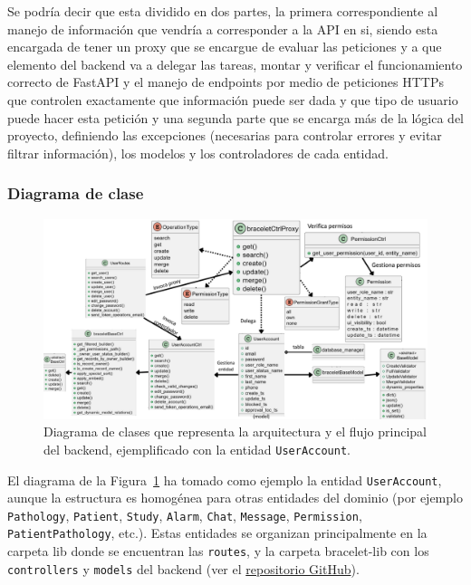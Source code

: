\documentclass[12pt, a4paper]{article}
\begin{document}
Se podría decir que esta dividido en dos partes, la primera correspondiente al manejo de información que vendría a corresponder a la API en si, siendo esta encargada de tener un proxy que se encargue de evaluar las peticiones y a que elemento del backend va a delegar las tareas, montar y verificar el funcionamiento correcto de FastAPI y el manejo de endpoints por medio de peticiones HTTPs que controlen exactamente que información puede ser dada y que tipo de usuario puede hacer esta petición y una segunda parte que se encarga más de la lógica del proyecto, definiendo las excepciones (necesarias para controlar errores y evitar filtrar información), los modelos y los controladores de cada entidad.
\subsubsection{Diagrama de clase}

\begin{figure}[htbp]
	\centering
	\includegraphics[width=1\textwidth]{images/diagramaClaseBackend.png}
	\caption[Diagrama de clases del backend]{Diagrama de clases que representa la arquitectura y el flujo principal del backend, ejemplificado con la entidad \texttt{UserAccount}.}
	\label{fig:diagramaClaseBackend}
\end{figure}

El diagrama de la Figura~\ref{fig:diagramaClaseBackend} ha tomado como ejemplo la entidad \texttt{UserAccount}, aunque la estructura es homogénea para otras entidades del dominio (por ejemplo \texttt{Pathology}, \texttt{Patient}, \texttt{Study}, \texttt{Alarm}, \texttt{Chat}, \texttt{Message}, \texttt{Permission}, \texttt{PatientPathology}, etc.). Estas entidades se organizan principalmente en la carpeta lib donde se encuentran las \texttt{routes}, y la carpeta bracelet-lib con los \texttt{controllers} y \texttt{models} del backend (ver el \href{https://github.com/Diegodepab/TFG_Pulsera_Seguimiento_Pacientes_Avanzada_Edad/tree/main/PLATFORM/backend}{repositorio GitHub}).
\end{document}
